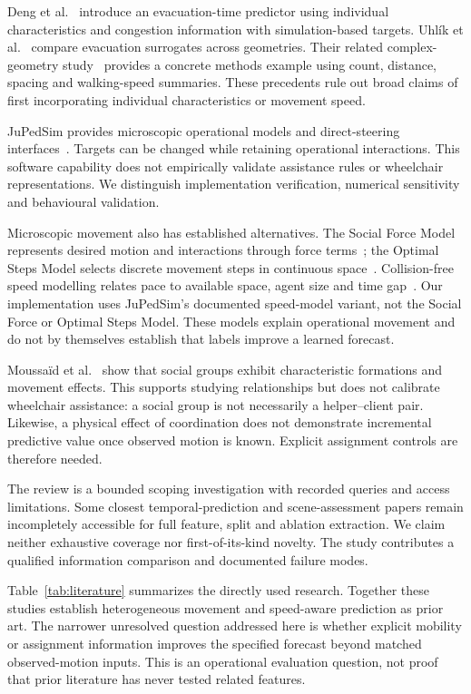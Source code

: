 \documentclass[conference]{IEEEtran}
\begin{document}
Deng et al.~\cite{deng} introduce an evacuation-time predictor using individual characteristics and congestion information with simulation-based targets. Uhl\'{i}k et al.~\cite{rset} compare evacuation surrogates across geometries. Their related complex-geometry study~\cite{femtc} provides a concrete methods example using count, distance, spacing and walking-speed summaries. These precedents rule out broad claims of first incorporating individual characteristics or movement speed.

JuPedSim provides microscopic operational models and direct-steering interfaces~\cite{jps}. Targets can be changed while retaining operational interactions. This software capability does not empirically validate assistance rules or wheelchair representations. We distinguish implementation verification, numerical sensitivity and behavioural validation.

Microscopic movement also has established alternatives. The Social Force Model represents desired motion and interactions through force terms~\cite{helbing}; the Optimal Steps Model selects discrete movement steps in continuous space~\cite{seitz}. Collision-free speed modelling relates pace to available space, agent size and time gap~\cite{tordeux}. Our implementation uses JuPedSim's documented speed-model variant, not the Social Force or Optimal Steps Model. These models explain operational movement and do not by themselves establish that labels improve a learned forecast.

Moussa\"id et al.~\cite{moussaid} show that social groups exhibit characteristic formations and movement effects. This supports studying relationships but does not calibrate wheelchair assistance: a social group is not necessarily a helper--client pair. Likewise, a physical effect of coordination does not demonstrate incremental predictive value once observed motion is known. Explicit assignment controls are therefore needed.

The review is a bounded scoping investigation with recorded queries and access limitations. Some closest temporal-prediction and scene-assessment papers remain incompletely accessible for full feature, split and ablation extraction. We claim neither exhaustive coverage nor first-of-its-kind novelty. The study contributes a qualified information comparison and documented failure modes.

Table~\ref{tab:literature} summarizes the directly used research. Together these studies establish heterogeneous movement and speed-aware prediction as prior art. The narrower unresolved question addressed here is whether explicit mobility or assignment information improves the specified forecast beyond matched observed-motion inputs. This is an operational evaluation question, not proof that prior literature has never tested related features.
\end{document}
